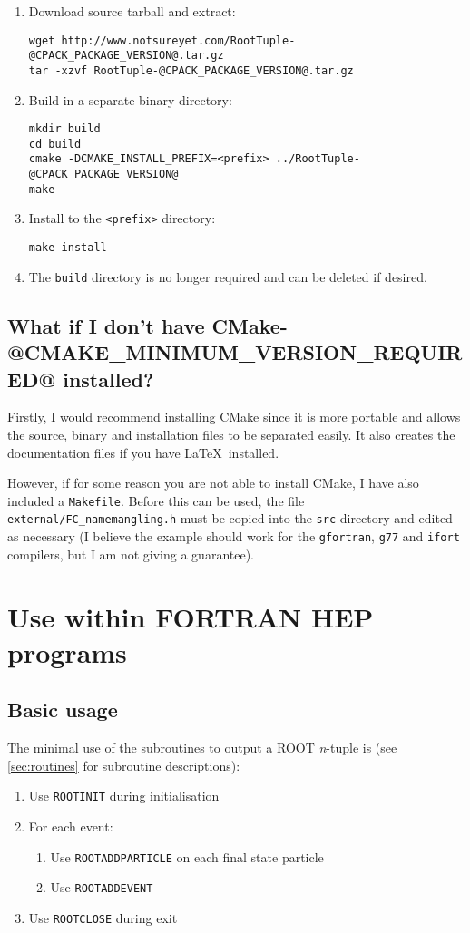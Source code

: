\documentclass[a4paper,12pt]{article}
\begin{document}
\begin{enumerate}
    \item Download source tarball and extract:\begin{verbatim}
wget http://www.notsureyet.com/RootTuple-@CPACK_PACKAGE_VERSION@.tar.gz
tar -xzvf RootTuple-@CPACK_PACKAGE_VERSION@.tar.gz\end{verbatim}
    \item Build in a separate binary directory:\begin{verbatim}
mkdir build
cd build
cmake -DCMAKE_INSTALL_PREFIX=<prefix> ../RootTuple-@CPACK_PACKAGE_VERSION@
make\end{verbatim}
    \item Install to the \verb|<prefix>| directory:\begin{verbatim}
make install\end{verbatim}
    \item The \verb|build| directory is no longer required and can be deleted if desired.
\end{enumerate}

\subsection{What if I don't have CMake-@CMAKE_MINIMUM_VERSION_REQUIRED@ installed?}
Firstly, I would recommend installing CMake since it is more portable and allows the source, binary and installation files to be separated easily. It also creates the documentation files if you have \LaTeX~installed.

However, if for some reason you are not able to install CMake, I have also included a \verb|Makefile|. Before this can be used, the file \verb|external/FC_namemangling.h| must be copied into the \verb|src| directory and edited as necessary (I believe the example should work for the \verb|gfortran|, \verb|g77| and \verb|ifort| compilers, but I am not giving a guarantee).

\section{Use within FORTRAN HEP programs}
\label{sec:usage}
\subsection{Basic usage}
The minimal use of the subroutines to output a ROOT \emph{n}-tuple is (see \textsection\ref{sec:routines} for subroutine descriptions):
\begin{enumerate}
    \item Use \verb|ROOTINIT| during initialisation
    \item For each event:
    \begin{enumerate}
        \item Use \verb|ROOTADDPARTICLE| on each final state particle
        \item Use \verb|ROOTADDEVENT|
    \end{enumerate}
    \item Use \verb|ROOTCLOSE| during exit
\end{enumerate}
\end{document}
